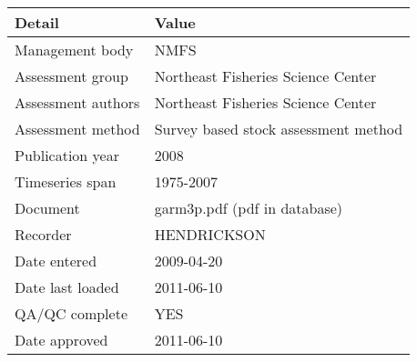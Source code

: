 \begin{table}[htb]
\centering
\begin{tabular}{lp{7cm}}
\toprule
Detail & Value \\
\midrule
Management body    & NMFS                                 \\
Assessment group   & Northeast Fisheries Science Center   \\
Assessment authors & Northeast Fisheries Science Center   \\
Assessment method  & Survey based stock assessment method \\
Publication year   & 2008                                 \\
Timeseries span    & 1975-2007                            \\
Document           & garm3p.pdf (pdf in database)         \\
Recorder           & HENDRICKSON                          \\
Date entered       & 2009-04-20                           \\
Date last loaded   & 2011-06-10                           \\
QA/QC complete     & YES                                  \\
Date approved      & 2011-06-10                           \\
\bottomrule
\end{tabular}
\label{tab:assessdet}
\end{table}
